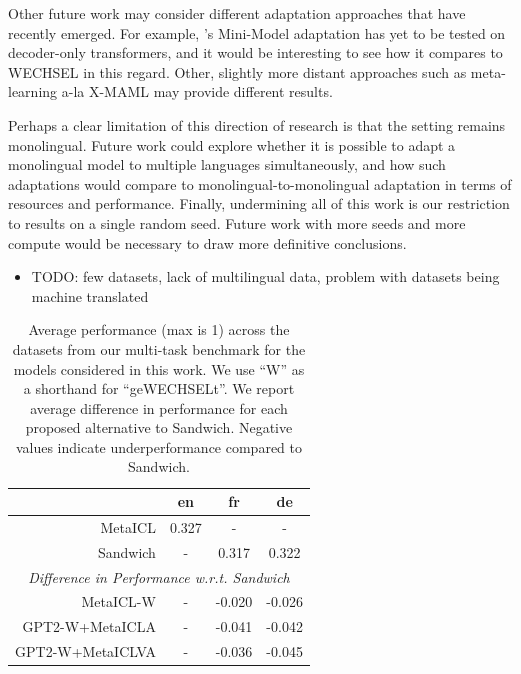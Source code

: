\documentclass[11pt]{article}
\begin{document}
Other future work may consider different adaptation approaches that have recently emerged. For
example, \citet{marchisio_mini-model_2022}'s Mini-Model adaptation has yet to be tested on
decoder-only transformers, and it would be interesting to see how it compares to WECHSEL in this
regard. Other, slightly more distant approaches such as meta-learning a-la X-MAML
\citep{nooralahzadeh_zero-shot_2020} may provide different results.

Perhaps a clear limitation of this direction of research is that the setting remains monolingual.
Future work could explore whether it is possible to adapt a monolingual model to multiple languages
simultaneously, and how such adaptations would compare to monolingual-to-monolingual adaptation in
terms of resources and performance. Finally, undermining all of this work is our restriction to
results on a single random seed. Future work with more seeds and more compute would be necessary to
draw more definitive conclusions.

\begin{itemize}
	\item TODO: few datasets, lack of multilingual data, problem with datasets being machine
	      translated
\end{itemize}

\begin{table}[ht]
	\centering
	\caption{Average performance (max is 1) across the datasets from our multi-task benchmark for the
		models considered in this work. We use ``W'' as a shorthand for ``geWECHSELt''. We report average
		difference in performance for each proposed alternative to Sandwich. Negative values indicate
		underperformance compared to Sandwich.}
	\label{tab:results-summary}
	\begin{tabular}{@{}rccc@{}}
		\toprule
		\multicolumn{1}{c}{} & en    & fr     & de                             \\ \midrule
		MetaICL              & 0.327 & -      & -                              \\
		Sandwich             & -     & 0.317  & 0.322                          \\ \midrule
		\multicolumn{4}{c}{\textit{Difference in Performance w.r.t. Sandwich}} \\
		MetaICL-W            & -     & -0.020 & -0.026                         \\
		GPT2-W+MetaICLA      & -     & -0.041 & -0.042                         \\
		GPT2-W+MetaICLVA     & -     & -0.036 & -0.045                         \\ \bottomrule
	\end{tabular}
\end{table}
\end{document}
